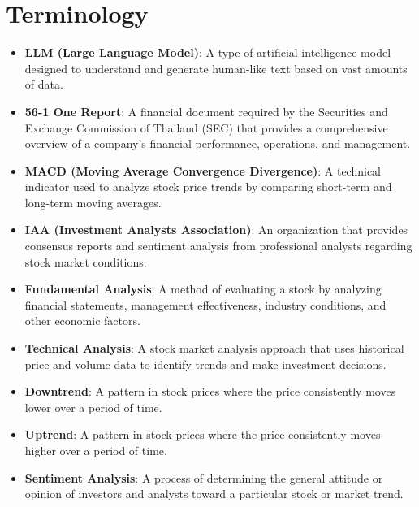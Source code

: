 \section{Terminology}
\label{section:terminology}

\begin{itemize}
    \item \textbf{LLM (Large Language Model)}: A type of artificial intelligence model designed to understand and generate human-like text based on vast amounts of data.
    \item \textbf{56-1 One Report}: A financial document required by the Securities and Exchange Commission of Thailand (SEC) that provides a comprehensive overview of a company's financial performance, operations, and management.
    \item \textbf{MACD (Moving Average Convergence Divergence)}: A technical indicator used to analyze stock price trends by comparing short-term and long-term moving averages.
    \item \textbf{IAA (Investment Analysts Association)}: An organization that provides consensus reports and sentiment analysis from professional analysts regarding stock market conditions.
    \item \textbf{Fundamental Analysis}: A method of evaluating a stock by analyzing financial statements, management effectiveness, industry conditions, and other economic factors.
    \item \textbf{Technical Analysis}: A stock market analysis approach that uses historical price and volume data to identify trends and make investment decisions.
    \item \textbf{Downtrend}: A pattern in stock prices where the price consistently moves lower over a period of time.
    \item \textbf{Uptrend}: A pattern in stock prices where the price consistently moves higher over a period of time.
    \item \textbf{Sentiment Analysis}: A process of determining the general attitude or opinion of investors and analysts toward a particular stock or market trend.
\end{itemize}
